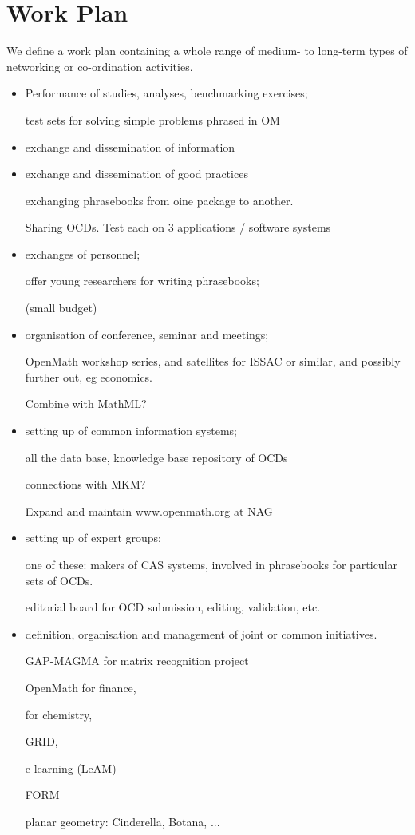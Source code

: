 \documentclass{euproposal}
\begin{document}
\chapter{Work Plan}
We define a work plan containing a
whole range of medium- to long-term types of networking or co-ordination
activities.
\begin{itemize}
\item
Performance of studies, analyses, benchmarking exercises;

test sets for  solving simple problems phrased in OM


\item
exchange and dissemination of information

\item exchange and dissemination of good practices

exchanging phrasebooks from oine package to another.

Sharing OCDs.
Test each on 3 applications / software systems

\item exchanges of personnel;

offer young researchers for writing phrasebooks;

(small  budget)


\item 
organisation of conference, seminar and meetings;

OpenMath workshop series, and satellites for ISSAC or similar, and possibly
further out, eg economics.

Combine with MathML?

\item 
setting up of common information systems;

all the data base, knowledge base repository of OCDs

connections with MKM?

Expand and maintain www.openmath.org at NAG


\item 
setting up of expert groups;

one of these: makers of CAS systems, involved in phrasebooks for
particular sets of OCDs.

editorial board for OCD submission, editing, validation, etc.

\item 
definition, organisation and management of joint or common initiatives.

GAP-MAGMA for matrix recognition project

OpenMath for finance,

for chemistry,

GRID,

e-learning (LeAM)

FORM

planar geometry: Cinderella, Botana, ...



\end{itemize}
\end{document}
